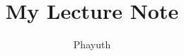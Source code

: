 \documentclass[12pt,a4paper]{book}
\begin{document}
	\title{My Lecture Note}
	\author{Phayuth}
	\maketitle
	
	\tableofcontents

	
	
	
	
	
	
	
	
	
	
	
	
	
	
	
	
\end{document}
